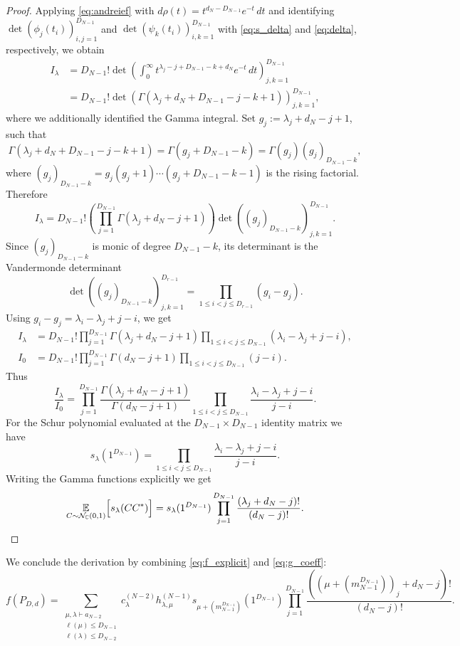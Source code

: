 \documentclass{article}
\theoremstyle{definition}
\newcommand{\C}{\mathbb{C}}
\begin{document}
\begin{proof}
Applying \eqref{eq:andreief} with $d\rho(t)=t^{d_N-D_{N-1}}e^{-t}\,dt$ and identifying $\det(\phi_j(t_i))_{i,j=1}^{D_{N-1}}$ and $\det(\psi_k(t_i))_{i,k=1}^{D_{N-1}}$ with \eqref{eq:s_delta} and \eqref{eq:delta}, respectively,
we obtain
\begin{align*}
    I_\lambda
&=
D_{N-1}!\det\left(
\int_0^\infty
t^{\lambda_j-j+D_{N-1}-k+d_N}e^{-t}\,dt
\right)_{j,k=1}^{D_{N-1}} \\
&= D_{N-1}!\det\left(\Gamma(\lambda_j+d_N+D_{N-1}-j-k+1)\right)_{j,k=1}^{D_{N-1}},
\end{align*}
where we additionally identified the Gamma integral.
Set $g_j:=\lambda_j+d_N-j+1$, such that 
\[
\Gamma(\lambda_j+d_N+D_{N-1}-j-k+1)
=
\Gamma(g_j+D_{N-1}-k)
=
\Gamma(g_j)(g_j)_{D_{N-1}-k},
\]
where $(g_j)_{D_{N-1}-k} = g_j(g_j + 1)\cdots (g_j + D_{N-1}-k -1)$ is the rising factorial.
Therefore
\[
I_\lambda
=
D_{N-1}!
\left(\prod_{j=1}^{D_{N-1}} \Gamma(\lambda_j+d_N-j+1)\right)
\det\left((g_j)_{D_{N-1}-k}\right)_{j,k=1}^{D_{N-1}}.
\]
Since \((g_j)_{D_{N-1}-k}\) is monic of degree \(D_{N-1}-k\), its determinant is the
Vandermonde determinant
\[
\det\left((g_j)_{D_{N-1}-k}\right)_{j,k=1}^{D_{r-1}}
=
\prod_{1\le i<j\le D_{r-1}}(g_i-g_j).
\]
Using $g_i-g_j=\lambda_i-\lambda_j+j-i$, we get
\begin{align*}
    I_\lambda
&=
D_{N-1}!
\prod_{j=1}^{D_{N-1}} \Gamma(\lambda_j+d_N-j+1)
\prod_{1\le i<j\le D_{N-1}}
(\lambda_i-\lambda_j+j-i), \\
I_0
&=
D_{N-1}!
\prod_{j=1}^{D_{N-1}} \Gamma(d_N-j+1)
\prod_{1\le i<j\le D_{N-1}}
(j-i).
\end{align*}
Thus
\[
\frac{I_\lambda}{I_0}
=
\prod_{j=1}^{D_{N-1}}
\frac{\Gamma(\lambda_j+d_N-j+1)}{\Gamma(d_N-j+1)}
\prod_{1\le i<j\le D_{N-1}}
\frac{\lambda_i-\lambda_j+j-i}{j-i}.
\]
For the Schur polynomial evaluated at the $D_{N-1}\times D_{N-1}$ identity matrix we have \cite{Fulton_1991}
\begin{equation}\label{eq:schur_identity}
s_\lambda(1^{D_{N-1}})
=
\prod_{1\le i<j\le D_{N-1}}
\frac{\lambda_i-\lambda_j+j-i}{j-i}.
\end{equation}
Writing the Gamma functions explicitly we get
\[
\underset{C \sim \mathcal N_{\C}(0,1)}{\mathbb{E}}\Big[s_{\lambda}(CC^*)\Big]
=
s_\lambda(1^{D_{N-1}})
\prod_{j=1}^{D_{N-1}}
\frac{(\lambda_j+d_N-j)!}{(d_N-j)!}. \qedhere
\]
\end{proof}
\noindent
We conclude the derivation by combining \eqref{eq:f_explicit} and \eqref{eq:g_coeff}:
\begin{equation}\label{eq:super_long_f}
        f(P_{D,d}) = \sum_{\substack{\mu, \lambda\vdash a_{N-2}\\ \ell(\mu)\le D_{N-1} \\
        \ell(\lambda)\le D_{N-2}}}
c_\lambda^{(N-2)}h_{\lambda,\mu}^{(N-1)}s_{\mu+(m_{N-1}^{D_{N-1}})}(1^{D_{N-1}})
\prod_{j=1}^{D_{N-1}}
\frac{((\mu+(m_{N-1}^{D_{N-1}}))_j+d_N-j)!}{(d_N-j)!}.
\end{equation}
\end{document}
